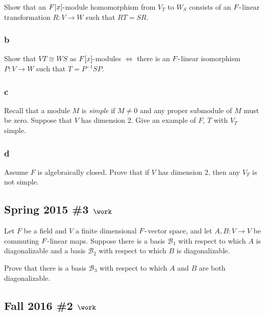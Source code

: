 Show that an \(F[x]{\hbox{-}}\)module homomorphism from \(V_T\) to
\(W_S\) consists of an \(F{\hbox{-}}\)linear transformation
\(R : V \to W\) such that \(RT = SR\).

\hypertarget{b-86}{%
\subsubsection{b}\label{b-86}}

Show that \(VT \cong WS\) as \(F[x]{\hbox{-}}\)modules \(\iff\) there is
an \(F{\hbox{-}}\)linear isomorphism \(P : V \to W\) such that
\(T = P^{-1}SP\).

\hypertarget{c-56}{%
\subsubsection{c}\label{c-56}}

Recall that a module \(M\) is \emph{simple} if \(M \neq 0\) and any
proper submodule of \(M\) must be zero. Suppose that \(V\) has dimension
2. Give an example of \(F\), \(T\) with \(V_T\) simple.

\hypertarget{d-16}{%
\subsubsection{d}\label{d-16}}

Assume \(F\) is algebraically closed. Prove that if \(V\) has dimension
2, then any \(V_T\) is not simple.

\hypertarget{spring-2015-3-work}{%
\subsection{\texorpdfstring{Spring 2015 \#3
\(\work\)}{Spring 2015 \#3 \textbackslash work}}\label{spring-2015-3-work}}

Let \(F\) be a field and \(V\) a finite dimensional
\(F{\hbox{-}}\)vector space, and let \(A, B: V\to V\) be commuting
\(F{\hbox{-}}\)linear maps. Suppose there is a basis \({\mathcal{B}}_1\)
with respect to which \(A\) is diagonalizable and a basis
\({\mathcal{B}}_2\) with respect to which \(B\) is diagonalizable.

Prove that there is a basis \({\mathcal{B}}_3\) with respect to which
\(A\) and \(B\) are both diagonalizable.

\hypertarget{fall-2016-2-work}{%
\subsection{\texorpdfstring{Fall 2016 \#2
\(\work\)}{Fall 2016 \#2 \textbackslash work}}\label{fall-2016-2-work}}

